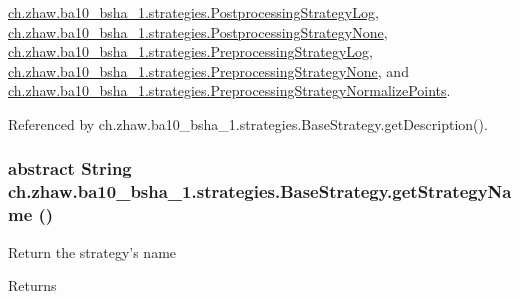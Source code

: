 \hyperlink{classch_1_1zhaw_1_1ba10__bsha__1_1_1strategies_1_1PostprocessingStrategyLog_a408e3b37b22ae4e501a65ce78afce2a1}{ch.zhaw.ba10\_\-bsha\_\-1.strategies.PostprocessingStrategyLog}, \hyperlink{classch_1_1zhaw_1_1ba10__bsha__1_1_1strategies_1_1PostprocessingStrategyNone_aa6732900e4c07b57f238da6134c8405a}{ch.zhaw.ba10\_\-bsha\_\-1.strategies.PostprocessingStrategyNone}, \hyperlink{classch_1_1zhaw_1_1ba10__bsha__1_1_1strategies_1_1PreprocessingStrategyLog_a9dc4e3fe302e8e318c68e3f2257a8979}{ch.zhaw.ba10\_\-bsha\_\-1.strategies.PreprocessingStrategyLog}, \hyperlink{classch_1_1zhaw_1_1ba10__bsha__1_1_1strategies_1_1PreprocessingStrategyNone_aa9acb726892bd3fb6641de865c60cfed}{ch.zhaw.ba10\_\-bsha\_\-1.strategies.PreprocessingStrategyNone}, and \hyperlink{classch_1_1zhaw_1_1ba10__bsha__1_1_1strategies_1_1PreprocessingStrategyNormalizePoints_a9b2a647c2f4d9702d943dbe8ef43485e}{ch.zhaw.ba10\_\-bsha\_\-1.strategies.PreprocessingStrategyNormalizePoints}.

Referenced by ch.zhaw.ba10\_\-bsha\_\-1.strategies.BaseStrategy.getDescription().\hypertarget{classch_1_1zhaw_1_1ba10__bsha__1_1_1strategies_1_1BaseStrategy_aa0ebed55eed45409bad13d43a0058780}{
\subsubsection[{getStrategyName}]{\setlength{\rightskip}{0pt plus 5cm}abstract String ch.zhaw.ba10\_\-bsha\_\-1.strategies.BaseStrategy.getStrategyName ()}}
\label{classch_1_1zhaw_1_1ba10__bsha__1_1_1strategies_1_1BaseStrategy_aa0ebed55eed45409bad13d43a0058780}
Return the strategy's name

\begin{DoxyReturn}{Returns}

\end{DoxyReturn}


